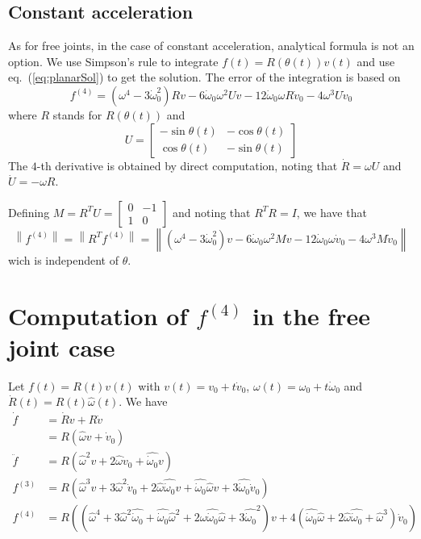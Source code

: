 \documentclass[]{article}
\newcommand{\BIN}{\begin{bmatrix}}
\newcommand{\BOUT}{\end{bmatrix}}
\newcommand{\norm}[1]{\left\| #1 \right\|}
\newcommand{\w}{\omega}
\newcommand{\dw}{\dot{\omega}}
\newcommand{\dv}{\dot{v}}
\begin{document}
\subsection{Constant acceleration}
As for free joints, in the case of constant acceleration, analytical formula is not an option. We use Simpson's rule to integrate $f(t) = R(\theta(t))v(t)$ and use eq.~(\ref{eq:planarSol}) to get the solution.
The error of the integration is based on
\begin{equation}
 f^{(4)} = \left(\w^4 - 3 \dw_0^2 \right) R v - 6 \dw_0 \w^2 U v -12 \dw_0 \w R \dv_0  - 4 \w^3 U \dv_0
\end{equation}
where $R$ stands for $R(\theta(t))$ and
\begin{equation}
	U = \BIN -\sin{\theta(t)} & -\cos{\theta(t)} \\ \cos{\theta(t)} & -\sin{\theta(t)} \BOUT
\end{equation}
The $4$-th derivative is obtained by direct computation, noting that $\dot{R} = \w U$ and $\dot{U} = -\w R$.

Defining $M = R^T U = \BIN 0 & -1 \\ 1 & 0 \BOUT$ and noting that $R^T R = I$, we have that
\begin{equation}
	\norm{f^{(4)}} = \norm{R^T f^{(4)}} = \norm{\left(\w^4 - 3 \dw_0^2 \right) v - 6 \dw_0 \w^2 M v -12 \dw_0 \w \dv_0  - 4 \w^3 M \dv_0}
\end{equation}
wich is independent of $\theta$.


\appendix
\section{Computation of $f^{(4)}$ in the free joint case}
Let $f(t) = R(t)v(t)$ with $v(t) = v_0 + t \dv_0$, $\w(t) = \w_0 + t \dw_0$ and $\dot{R}(t) = R(t)\hat{\w}(t)$. We have
\begin{align*}
	\dot{f} &= \dot{R}v + R\dot{v}\\
	&= R \left(\hat{\w}v+\dv_0 \right)\\
	\ddot{f} &= R \left( \hat{\w}^2v + 2\hat{\w}\dv_0 + \widehat{\dw_0} v\right)\\
	f^{(3)} &= R \left(\hat{\w}^3v + 3\hat{\w}^2\dv_0 + 2\hat{\w} \widehat{\dw_0} v + \widehat{\dw_0} \hat{\w} v + 3 \widehat{\dw_0} \dv_0 \right)\\
	f^{(4)} &= R \left(\left(\hat{\w}^4 + 3\hat{\w}^2 \widehat{\dw_0} + \widehat{\dw_0} \hat{\w}^2 + 2\hat{\w}\widehat{\dw_0}\hat{\w} + 3\widehat{\dw_0}^2\right)v + 4\left(\widehat{\dw_0}\hat{\w} + 2 \hat{\w}\widehat{\dw_0} + \hat{\w}^3 \right) \dv_0 \right)
\end{align*}
\end{document}
